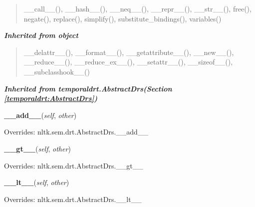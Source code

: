 \begin{quote}
\_\_call\_\_(), \_\_hash\_\_(), \_\_neq\_\_(), \_\_repr\_\_(), \_\_str\_\_(), free(), negate(), replace(), simplify(), substitute\_bindings(), variables()
\end{quote}

\large{\textbf{\textit{Inherited from object}}}

\begin{quote}
\_\_delattr\_\_(), \_\_format\_\_(), \_\_getattribute\_\_(), \_\_new\_\_(), \_\_reduce\_\_(), \_\_reduce\_ex\_\_(), \_\_setattr\_\_(), \_\_sizeof\_\_(), \_\_subclasshook\_\_()
\end{quote}

\large{\textbf{\textit{Inherited from temporaldrt.AbstractDrs\textit{(Section \ref{temporaldrt:AbstractDrs})}}}}

    \vspace{0.5ex}

\hspace{.8\funcindent}\begin{boxedminipage}{\funcwidth}

    \raggedright \textbf{\_\_add\_\_}(\textit{self}, \textit{other})

\setlength{\parskip}{2ex}
\setlength{\parskip}{1ex}
      Overrides: nltk.sem.drt.AbstractDrs.\_\_add\_\_

    \end{boxedminipage}

    \vspace{0.5ex}

\hspace{.8\funcindent}\begin{boxedminipage}{\funcwidth}

    \raggedright \textbf{\_\_gt\_\_}(\textit{self}, \textit{other})

\setlength{\parskip}{2ex}
\setlength{\parskip}{1ex}
      Overrides: nltk.sem.drt.AbstractDrs.\_\_gt\_\_

    \end{boxedminipage}

    \vspace{0.5ex}

\hspace{.8\funcindent}\begin{boxedminipage}{\funcwidth}

    \raggedright \textbf{\_\_lt\_\_}(\textit{self}, \textit{other})

\setlength{\parskip}{2ex}
\setlength{\parskip}{1ex}
      Overrides: nltk.sem.drt.AbstractDrs.\_\_lt\_\_

    \end{boxedminipage}

